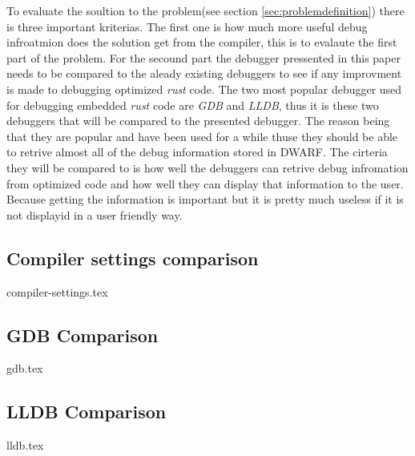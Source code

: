 

To evaluate the soultion to the problem(see section \ref{sec:problemdefinition}) there is three important kriterias.
The first one is how much more useful debug infroatmion does the solution get from the compiler, this is to evalaute the first part of the problem. 
For the secound part the debugger pressented in this paper needs to be compared to the aleady existing debuggers to see if any improvment is made to debugging optimized \emph{rust} code.
The two most popular debugger used for debugging embedded \emph{rust} code are \emph{GDB} and \emph{LLDB}, thus it is these two debuggers that will be compared to the presented debugger.
The reason being that they are popular and have been used for a while thuse they should be able to retrive almost all of the debug information stored in \gls{DWARF}.
The cirteria they will be compared to is how well the debuggers can retrive debug infromation from optimized code and how well they can display that information to the user.
Because getting the information is important but it is pretty much useless if it is not displayid in a user friendly way.


\subsection{Compiler settings comparison}
{compiler-settings.tex}


\subsection{GDB Comparison}
{gdb.tex}


\subsection{LLDB Comparison}
{lldb.tex}

